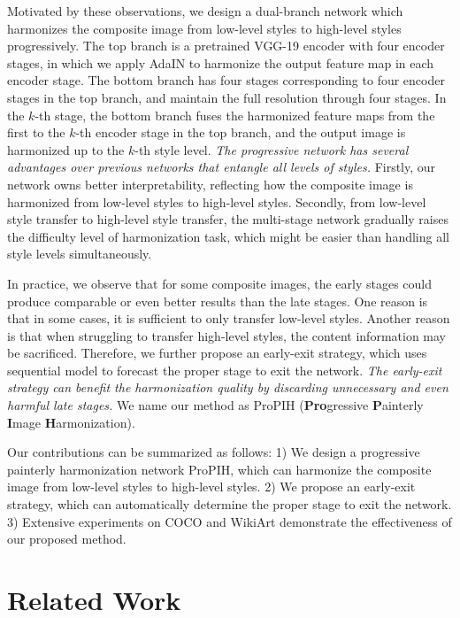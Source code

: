 \documentclass[letterpaper]{article} %
\begin{document}
Motivated by these observations, we design a dual-branch network which harmonizes the composite image from low-level styles to high-level styles progressively. The top branch is a pretrained VGG-19 \cite{VGG19} encoder with four encoder stages, in which we apply AdaIN \cite{huang2017arbitrary} to harmonize the output feature map in each encoder stage. The bottom branch has four stages corresponding to four encoder stages in the top branch, and maintain the full resolution through four stages.  In the $k$-th stage, the bottom branch fuses the harmonized feature maps from the first to the $k$-th encoder stage in the top branch, and the output image is harmonized up to the $k$-th style level. \emph{The progressive network has several advantages over previous networks that entangle all levels of styles.} Firstly, our network owns better interpretability, reflecting how the composite image is harmonized from low-level styles to high-level styles. Secondly, from low-level style transfer to high-level style transfer, the multi-stage network gradually raises the difficulty level of harmonization task, which might be easier than handling all style levels simultaneously.

In practice, we observe that for some composite images, the early stages could produce comparable or even better results than the late stages.  One reason is that in some cases, it is sufficient to only transfer low-level styles. Another reason is that when struggling to transfer high-level styles, the content information may be sacrificed.  Therefore, we further propose an early-exit strategy, which uses sequential model  to forecast the proper stage to exit the network. \emph{The early-exit strategy can benefit the harmonization quality by discarding unnecessary and even harmful late stages.} We name our method as ProPIH (\textbf{Pro}gressive \textbf{P}ainterly \textbf{I}mage \textbf{H}armonization).


Our contributions can be summarized as follows: 1) We design a progressive painterly harmonization network ProPIH, which can harmonize the composite image from low-level styles to high-level styles. 2) We propose an early-exit strategy, which can automatically determine the proper stage to exit the network. 3) Extensive experiments on COCO \cite{lin2014microsoft} and WikiArt \cite{nichol2016painter} demonstrate the effectiveness of our proposed method.


\section{Related Work}
\end{document}
